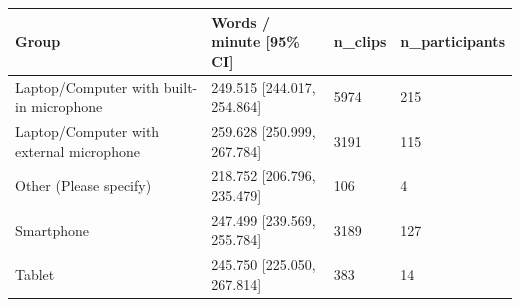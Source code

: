 \begin{tabular}{llll}
\toprule
Group & Words / minute [95\% CI] & n\_clips & n\_participants \\
\midrule
Laptop/Computer with built-in microphone & 249.515 [244.017, 254.864] & 5974 & 215 \\
Laptop/Computer with external microphone & 259.628 [250.999, 267.784] & 3191 & 115 \\
Other (Please specify) & 218.752 [206.796, 235.479] & 106 & 4 \\
Smartphone & 247.499 [239.569, 255.784] & 3189 & 127 \\
Tablet & 245.750 [225.050, 267.814] & 383 & 14 \\
\bottomrule
\end{tabular}
